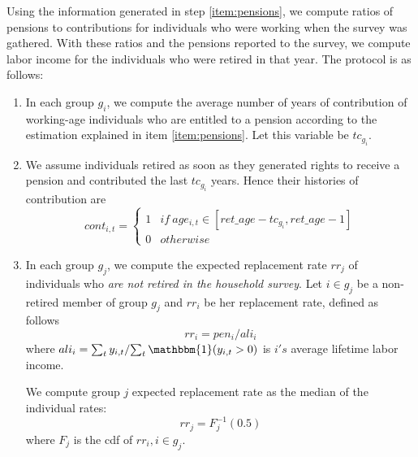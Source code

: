 \documentclass{article}
\begin{document}
\begin{enumerate}
Using the information generated in step \ref{item:pensions}, we compute ratios of pensions to contributions for individuals who were working when the survey was gathered. With these ratios and the pensions reported to the survey, we compute labor income for the individuals who were retired in that year. 
The protocol is as follows:
\begin{enumerate}
    \item In each group $g_i$, we compute the average number of years of contribution of working-age individuals who are entitled to a pension according to the estimation explained in item \ref{item:pensions}. Let this variable be $tc_{g_i}$.
    \item We assume individuals retired as soon as they generated rights to receive a pension and contributed the last $tc_{g_i}$ years. Hence their histories of contribution are 
    \begin{equation}
        cont_{i,t}= \left \{
        \begin{array}{ll}
             1  & if \ age_{i,t}\in [ret\_age - tc_{g_i}, ret\_age - 1]  \\
             0 & otherwise 
        \end{array}
        \right .
    \end{equation}
    \item In each group $g_j$, we compute the expected replacement rate $rr_j$ of individuals who \textit{are not retired in the household survey}. Let $i\in g_j$ be a non-retired member of group $g_j$ and  $rr_i$ be her replacement rate, defined as follows
    \[ rr_i = pen_{i}/ali_i \]
    where
    $ali_i = {\sum_t y_{i,t}}/{\sum_t \mathbbm{1}(y_{i,t}>0)}$ is $i's$ average lifetime labor income.

    We compute group $j$ expected replacement rate as the median of the individual rates:
    \begin{equation} \label{eq:rr}
             rr_j = F_j^{-1}(0.5)
    \end{equation}
    where $F_j$ is the cdf of $rr_i, i\in g_j$.
    
  
 

\end{enumerate}
\end{enumerate}
\end{document}
